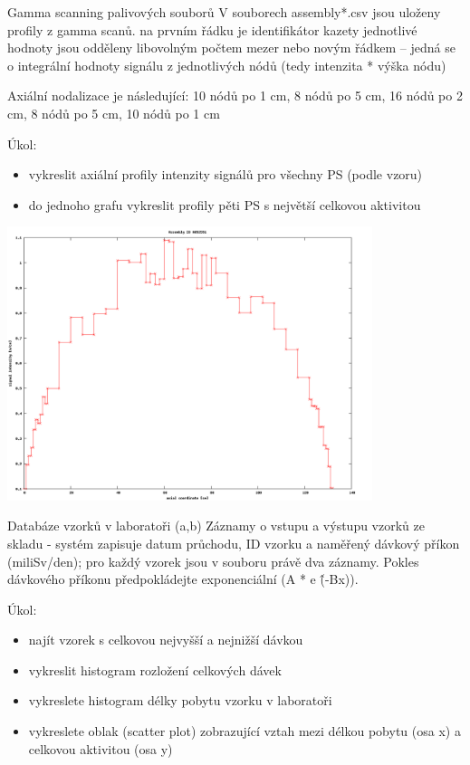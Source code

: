 \documentclass{beamer}
\begin{document}
\begin{frame}{Gamma scanning palivových souborů}
  V souborech assembly*.csv jsou uloženy profily z gamma scanů.
  na prvním řádku je identifikátor kazety
  jednotlivé hodnoty jsou odděleny libovolným počtem mezer nebo novým řádkem -- jedná se o integrální hodnoty signálu z jednotlivých nódů (tedy intenzita * výška nódu)

  Axiální nodalizace je následující: 10 nódů po 1 cm, 8 nódů po 5 cm, 16 nódů po 2 cm, 8 nódů po 5 cm, 10 nódů po 1 cm

  Úkol:
  \begin{itemize}
    \item vykreslit axiální profily intenzity signálů pro všechny PS (podle vzoru)
    \item do jednoho grafu vykreslit profily pěti PS s největší celkovou aktivitou
  \end{itemize}

\end{frame}

\begin{frame}{}
  \begin{center}
    \includegraphics[width=0.8\textwidth]{assembly_001}    
  \end{center}
\end{frame}

\begin{frame}{Databáze vzorků v laboratoři (a,b)}
  Záznamy o vstupu a výstupu vzorků ze skladu - systém zapisuje datum průchodu, ID vzorku a naměřený dávkový příkon (miliSv/den); pro každý vzorek jsou v souboru právě dva záznamy. Pokles dávkového příkonu předpokládejte exponenciální (A * e \^ (-Bx)).

  Úkol:
  
  \begin{itemize}
\item najít vzorek s celkovou nejvyšší a nejnižší dávkou  
\item vykreslit histogram rozložení celkových dávek
\item vykreslete histogram délky pobytu vzorku v laboratoři
\item vykreslete oblak (scatter plot) zobrazující vztah mezi délkou pobytu (osa x) a celkovou aktivitou (osa y)  
  \end{itemize}
\end{frame}
\end{document}
